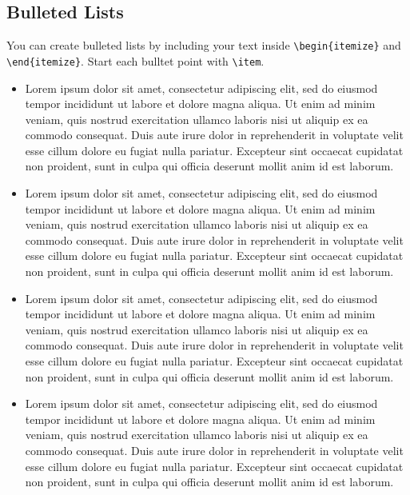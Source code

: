 \subsection{Bulleted Lists}
You can create bulleted lists by including your text inside \verb|\begin{itemize}| and \verb|\end{itemize}|. Start each bulltet point with \verb|\item|. \\
\begin{itemize}
\item Lorem ipsum dolor sit amet, consectetur adipiscing elit, sed do eiusmod tempor incididunt ut labore et dolore magna aliqua. Ut enim ad minim veniam, quis nostrud exercitation ullamco laboris nisi ut aliquip ex ea commodo consequat. Duis aute irure dolor in reprehenderit in voluptate velit esse cillum dolore eu fugiat nulla pariatur. Excepteur sint occaecat cupidatat non proident, sunt in culpa qui officia deserunt mollit anim id est laborum. \\
\item Lorem ipsum dolor sit amet, consectetur adipiscing elit, sed do eiusmod tempor incididunt ut labore et dolore magna aliqua. Ut enim ad minim veniam, quis nostrud exercitation ullamco laboris nisi ut aliquip ex ea commodo consequat. Duis aute irure dolor in reprehenderit in voluptate velit esse cillum dolore eu fugiat nulla pariatur. Excepteur sint occaecat cupidatat non proident, sunt in culpa qui officia deserunt mollit anim id est laborum. \\
\item Lorem ipsum dolor sit amet, consectetur adipiscing elit, sed do eiusmod tempor incididunt ut labore et dolore magna aliqua. Ut enim ad minim veniam, quis nostrud exercitation ullamco laboris nisi ut aliquip ex ea commodo consequat. Duis aute irure dolor in reprehenderit in voluptate velit esse cillum dolore eu fugiat nulla pariatur. Excepteur sint occaecat cupidatat non proident, sunt in culpa qui officia deserunt mollit anim id est laborum.
\item Lorem ipsum dolor sit amet, consectetur adipiscing elit, sed do eiusmod tempor incididunt ut labore et dolore magna aliqua. Ut enim ad minim veniam, quis nostrud exercitation ullamco laboris nisi ut aliquip ex ea commodo consequat. Duis aute irure dolor in reprehenderit in voluptate velit esse cillum dolore eu fugiat nulla pariatur. Excepteur sint occaecat cupidatat non proident, sunt in culpa qui officia deserunt mollit anim id est laborum.
\end{itemize}

